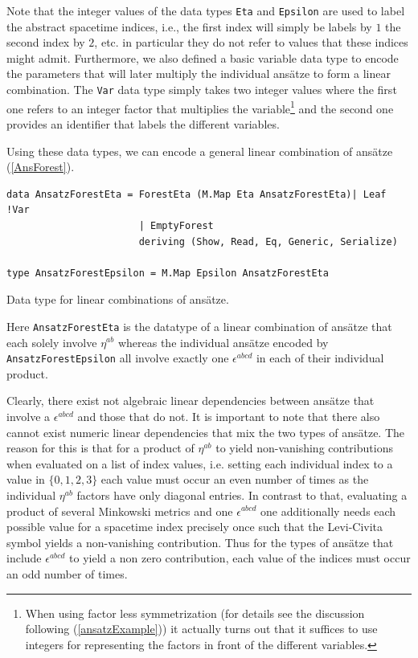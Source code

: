 \documentclass[a4paper,12pt, DIV=14, BCOR=5mm, twoside, headsepline, numbers=noenddot]{scrbook}
\begin{document}
Note that the integer values of the data types \texttt{Eta} and \texttt{Epsilon} are used to label the abstract spacetime indices, i.e., the first index will simply be labels by $1$ the second index by $2$, etc. in particular they do not refer to values that these indices might admit.
Furthermore, we also defined a basic variable data type to encode the parameters that will later multiply the individual ansätze to form a linear combination. The \texttt{Var}
data type simply takes two integer values where the first one refers to an integer factor that multiplies the variable\footnote{When using factor less symmetrization (for details see the discussion following (\ref{ansatzExample})) it actually turns out that it suffices to use integers for representing the factors in front of the different variables.} and the second one provides an identifier that labels the different variables. 

Using these data types, we can encode a general linear combination of ansätze (\ref{AnsForest}).

\begin{listing}[hbt!] 
\begin{verbatim}
data AnsatzForestEta = ForestEta (M.Map Eta AnsatzForestEta)| Leaf !Var
                       | EmptyForest 
                       deriving (Show, Read, Eq, Generic, Serialize)

type AnsatzForestEpsilon = M.Map Epsilon AnsatzForestEta
\end{verbatim} 
\caption{Data type for linear combinations of ansätze.}\label{AnsForest}
\end{listing}

Here \texttt{AnsatzForestEta} is the datatype of a linear combination of ansätze that each solely involve $\eta^{ab}$ whereas the individual ansätze encoded by \texttt{AnsatzForestEpsilon} all involve exactly one $\epsilon^{abcd}$ in each of their individual product.

Clearly, there exist not algebraic linear dependencies between ansätze that involve a $\epsilon^{abcd}$ and those that do not. 
It is important to note that there also cannot exist numeric linear dependencies that mix the two types of ansätze. The reason for this is that for a product of $\eta^{ab}$ to yield non-vanishing contributions when evaluated on a list of index values, i.e. setting each individual index to a value in $\{0,1,2,3 \}$ each value must occur an even number of times as the individual $\eta^{ab}$ factors have only diagonal entries. In contrast to that, evaluating a product of several Minkowski metrics and one $\epsilon^{abcd}$ one additionally needs each possible value for a spacetime index precisely once such that the Levi-Civita symbol yields a non-vanishing contribution. Thus for the types of ansätze that include $\epsilon^{abcd}$ to yield a non zero contribution, each value of the indices must occur an odd number of times.
\end{document}
